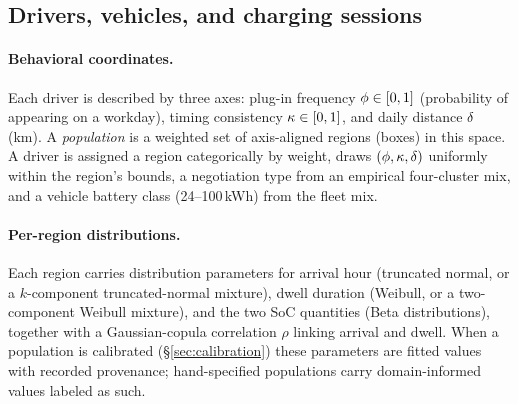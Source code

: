 \subsection{Drivers, vehicles, and charging sessions}
\label{sec:sessions}

\paragraph{Behavioral coordinates.}
Each driver is described by three axes: plug-in frequency
$\phi \in [0,1]$ (probability of appearing on a workday), timing
consistency $\kappa \in [0,1]$, and daily distance $\delta$ (km). A
\emph{population} is a weighted set of axis-aligned regions (boxes) in this
space. A driver is assigned a region categorically by weight, draws
$(\phi, \kappa, \delta)$ uniformly within the region's bounds, a
negotiation type from an empirical four-cluster mix, and a vehicle battery
class (24--100\,kWh) from the fleet mix.

\paragraph{Per-region distributions.}
Each region carries distribution parameters for arrival hour (truncated
normal, or a $k$-component truncated-normal mixture), dwell duration (Weibull,
or a two-component Weibull mixture), and the two SoC quantities (Beta
distributions), together with a Gaussian-copula correlation $\rho$ linking
arrival and dwell. When a population is calibrated
(\S\ref{sec:calibration}) these parameters are fitted values with recorded
provenance; hand-specified populations carry domain-informed values labeled
as such.

